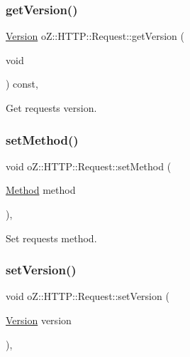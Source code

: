 \subsubsection{\texorpdfstring{getVersion()}{getVersion()}}
{\footnotesize\ttfamily \mbox{\hyperlink{structo_z_1_1_h_t_t_p_1_1_version}{Version}} o\+Z\+::\+H\+T\+T\+P\+::\+Request\+::get\+Version (\begin{DoxyParamCaption}\item[{void}]{ }\end{DoxyParamCaption}) const\hspace{0.3cm}{\ttfamily [inline]}, {\ttfamily [noexcept]}}



Get request\textquotesingle{}s version. 

\mbox{\label{classo_z_1_1_h_t_t_p_1_1_request_a9f3add384eca2de060c2f3c601e7b15e}} 
\subsubsection{\texorpdfstring{setMethod()}{setMethod()}}
{\footnotesize\ttfamily void o\+Z\+::\+H\+T\+T\+P\+::\+Request\+::set\+Method (\begin{DoxyParamCaption}\item[{\mbox{\hyperlink{namespaceo_z_1_1_h_t_t_p_a02d8497e4abbb0adf3af0fe9fad1b7a6}{Method}}}]{method }\end{DoxyParamCaption})\hspace{0.3cm}{\ttfamily [inline]}, {\ttfamily [noexcept]}}



Set request\textquotesingle{}s method. 

\mbox{\label{classo_z_1_1_h_t_t_p_1_1_request_a478b88fb4a88f9d0489b408162005b61}} 
\subsubsection{\texorpdfstring{setVersion()}{setVersion()}}
{\footnotesize\ttfamily void o\+Z\+::\+H\+T\+T\+P\+::\+Request\+::set\+Version (\begin{DoxyParamCaption}\item[{\mbox{\hyperlink{structo_z_1_1_h_t_t_p_1_1_version}{Version}}}]{version }\end{DoxyParamCaption})\hspace{0.3cm}{\ttfamily [inline]}, {\ttfamily [noexcept]}}



